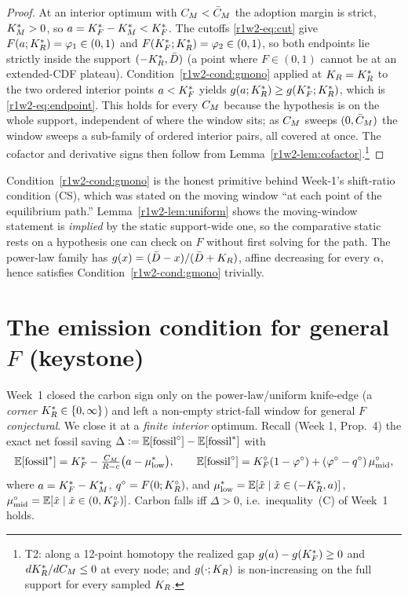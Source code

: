\begin{proof}
At an interior optimum with $C_M<\bar C_M$ the adoption margin is strict,
$K_M^{*}>0$, so $a=K_F^{*}-K_M^{*}<K_F^{*}$. The cutoffs \eqref{r1w2-eq:cut} give
$F(a;K_R^{*})=\varphi_1\in(0,1)$ and $F(K_F^{*};K_R^{*})=\varphi_2\in(0,1)$, so both
endpoints lie strictly inside the support $(-K_R^{*},\bar D)$ (a point where $F\in(0,1)$
cannot be at an extended-CDF plateau). Condition~\ref{r1w2-cond:gmono} applied at
$K_R=K_R^{*}$ to the two ordered interior points $a<K_F^{*}$ yields
$g(a;K_R^{*})\ge g(K_F^{*};K_R^{*})$, which is \eqref{r1w2-eq:endpoint}. This holds for every
$C_M$ because the hypothesis is on the whole support, independent of where the
window sits; as $C_M$ sweeps $(0,\bar C_M)$ the window sweeps a sub-family of
ordered interior pairs, all covered at once. The cofactor and derivative signs
then follow from Lemma~\ref{r1w2-lem:cofactor}.\footnote{T2: along a 12-point
homotopy the realized gap $g(a)-g(K_F^{*})\ge0$ and $dK_R^{*}/dC_M\le0$ at every node;
and $g(\cdot;K_R)$ is non-increasing on the full support for every sampled $K_R$.}
\end{proof}

\begin{remark}
Condition~\ref{r1w2-cond:gmono} is the honest primitive behind Week-1's
shift-ratio condition (CS), which was stated on the moving window ``at each point of the
equilibrium path.'' Lemma~\ref{r1w2-lem:uniform} shows the moving-window statement is
\emph{implied} by the static support-wide one, so the comparative static rests on
a hypothesis one can check on $F$ without first solving for the path. The
power-law family has $g(x)=(\bar D-x)/(\bar D+K_R)$, affine decreasing for every
$\alpha$, hence satisfies Condition~\ref{r1w2-cond:gmono} trivially.
\end{remark}

\section{The emission condition for general $F$ (keystone)}\label{r1w2-sec:keystone}

Week~1 closed the carbon sign only on the power-law/uniform knife-edge (a
\emph{corner} $K_R^{*}\in\{0,\infty\}$) and left a non-empty strict-fall window for
general $F$ \emph{conjectural}. We close it at a \emph{finite interior} optimum.
Recall (Week 1, Prop.~4) the exact net fossil saving
$\Delta\vcentcolon=\mathbb{E}[\text{fossil}^{\circ}]-\mathbb{E}[\text{fossil}^{*}]$ with
\begin{equation}\label{r1w2-eq:fos}
  \mathbb{E}[\text{fossil}^{*}]=K_F^{*}-\tfrac{C_M}{R-c}\big(a-\mu^{*}_{\mathrm{low}}\big),
  \qquad
  \mathbb{E}[\text{fossil}^{\circ}]=K_F^{\circ}(1-\varphi^{\circ})+(\varphi^{\circ}-q^{\circ})\,\mu^{\circ}_{\mathrm{mid}},
\end{equation}
where $a=K_F^{*}-K_M^{*}$, $q^{\circ}=F(0;K_R^{\circ})$, and
$\mu^{*}_{\mathrm{low}}=\mathbb{E}[\tilde x\mid\tilde x\in(-K_R^{*},a)]$,
$\mu^{\circ}_{\mathrm{mid}}=\mathbb{E}[\tilde x\mid\tilde x\in(0,K_F^{\circ})]$. Carbon falls iff
$\Delta>0$, i.e.\ inequality~(C) of Week~1 holds.


